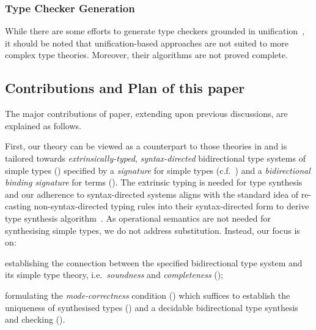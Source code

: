 \subsubsection{Type Checker Generation}
While there are some efforts to generate type checkers grounded in unification~\citep{Gast2004,Grewe2015}, it should be noted that unification-based approaches are not suited to more complex type theories.
Moreover, their algorithms are not proved complete.

\subsection{Contributions and Plan of this paper}
The major contributions of paper, extending upon previous discussions, are explained as follows.

First, our theory can be viewed as a counterpart to those theories in  and is tailored towards \emph{extrinsically-typed}, \emph{syntax-directed} bidirectional type systems of simple types () specified by a \emph{signature} for simple types (c.f.\ ) and a \emph{bidirectional binding signature} for terms (). 
The extrinsic typing is needed for type synthesis and our adherence to syntax-directed systems aligns with the standard idea of re-casting non-syntax-directed typing rules into their syntax-directed form to derive type synthesis algorithm~\citep{Peyton-Jones2007}.
As operational semantics are not needed for synthesising simple types, we do not address substitution.
Instead, our focus is on:
\begin{enumerate*}
  \item establishing the connection between the specified bidirectional type system and its simple type theory, i.e.\ \emph{soundness} and \emph{completeness} (); 
  \item formulating the \emph{mode-correctness} condition () which suffices to establish the uniqueness of synthesised types () and a decidable bidirectional type synthesis and checking ().
\end{enumerate*}

